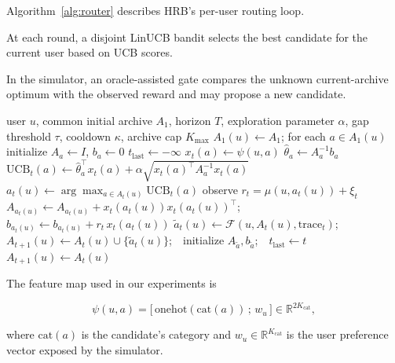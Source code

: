 \documentclass{article} %
\renewcommand{\eqref}[1]{\textup{(\ref{#1})}}
\begin{document}
Algorithm~\ref{alg:router} describes HRB's per-user routing loop.

At each round, a disjoint LinUCB bandit selects the best candidate for the current user based on UCB scores.

In the simulator, an oracle-assisted gate compares the unknown current-archive optimum with the observed reward and may propose a new candidate.

\begin{algorithm}[t]
\caption{HyperRidge-Base (HRB): per-user routing over a growing archive}
\label{alg:router}
\begin{algorithmic}[1]
\Require user $u$, common initial archive $A_1$, horizon $T$, exploration parameter $\alpha$, gap threshold $\tau$, cooldown $\kappa$, archive cap $K_{\max}$
\State $A_1(u) \gets A_1$; for each $a \in A_1(u)$ initialize $A_a \gets I$, $b_a \gets 0$
\State $t_{\mathrm{last}} \gets -\infty$
        \State $x_t(a) \gets \psi(u,a)$ \Comment{feature map, \eqref{eq:method-feat}}
        \State $\hat\theta_a \gets A_a^{-1} b_a$
        \State $\mathrm{UCB}_t(a) \gets \hat\theta_a^\top x_t(a) + \alpha \sqrt{x_t(a)^\top A_a^{-1} x_t(a)}$
    \EndFor
    \State $a_t(u) \gets \arg\max_{a \in A_t(u)} \mathrm{UCB}_t(a)$
    \State observe $r_t = \mu(u, a_t(u)) + \xi_t$
    \State $A_{a_t(u)} \gets A_{a_t(u)} + x_t(a_t(u)) x_t(a_t(u))^\top$;\quad $b_{a_t(u)} \gets b_{a_t(u)} + r_t \, x_t(a_t(u))$
     
        \State $\tilde a_t(u) \gets \mathcal{F}(u, A_t(u), \mathrm{trace}_t)$;\ \ $A_{t+1}(u) \gets A_t(u) \cup \{\tilde a_t(u)\}$;\ \ initialize $A_{\tilde a}, b_{\tilde a}$;\ \ $t_{\mathrm{last}} \gets t$
    \Else
        \State $A_{t+1}(u) \gets A_t(u)$
    \EndIf
\EndFor
\end{algorithmic}
\end{algorithm}

The feature map used in our experiments is

\begin{equation}
\label{eq:method-feat}
\psi(u,a) = \big[\,\mathrm{onehot}(\mathrm{cat}(a))\,;\, w_u\,\big] \in \mathbb{R}^{2K_{\mathrm{cat}}},
\end{equation}

where $\mathrm{cat}(a)$ is the candidate's category and $w_u \in \mathbb{R}^{K_{\mathrm{cat}}}$ is the user preference vector exposed by the simulator.
\end{document}
